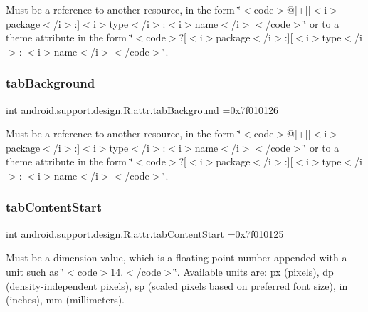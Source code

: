 Must be a reference to another resource, in the form \char`\"{}$<$code$>$@\mbox{[}+\mbox{]}\mbox{[}$<$i$>$package$<$/i$>$\+:\mbox{]}$<$i$>$type$<$/i$>$\+:$<$i$>$name$<$/i$>$$<$/code$>$\char`\"{} or to a theme attribute in the form \char`\"{}$<$code$>$?\mbox{[}$<$i$>$package$<$/i$>$\+:\mbox{]}\mbox{[}$<$i$>$type$<$/i$>$\+:\mbox{]}$<$i$>$name$<$/i$>$$<$/code$>$\char`\"{}. \mbox{\label{classandroid_1_1support_1_1design_1_1R_1_1attr_a0d6b5d1f9567a7ffe9de602efc8133f4}} 
\subsubsection{\texorpdfstring{tab\+Background}{tabBackground}}
{\footnotesize\ttfamily int android.\+support.\+design.\+R.\+attr.\+tab\+Background =0x7f010126\hspace{0.3cm}{\ttfamily [static]}}

Must be a reference to another resource, in the form \char`\"{}$<$code$>$@\mbox{[}+\mbox{]}\mbox{[}$<$i$>$package$<$/i$>$\+:\mbox{]}$<$i$>$type$<$/i$>$\+:$<$i$>$name$<$/i$>$$<$/code$>$\char`\"{} or to a theme attribute in the form \char`\"{}$<$code$>$?\mbox{[}$<$i$>$package$<$/i$>$\+:\mbox{]}\mbox{[}$<$i$>$type$<$/i$>$\+:\mbox{]}$<$i$>$name$<$/i$>$$<$/code$>$\char`\"{}. \mbox{\label{classandroid_1_1support_1_1design_1_1R_1_1attr_a6f43be6856c3cd04f1b3ea14fc2cc302}} 
\subsubsection{\texorpdfstring{tab\+Content\+Start}{tabContentStart}}
{\footnotesize\ttfamily int android.\+support.\+design.\+R.\+attr.\+tab\+Content\+Start =0x7f010125\hspace{0.3cm}{\ttfamily [static]}}

Must be a dimension value, which is a floating point number appended with a unit such as \char`\"{}$<$code$>$14.\+5sp$<$/code$>$\char`\"{}. Available units are\+: px (pixels), dp (density-\/independent pixels), sp (scaled pixels based on preferred font size), in (inches), mm (millimeters). 

